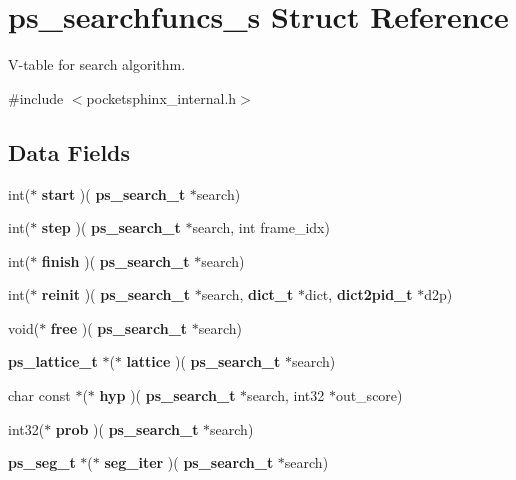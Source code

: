 \section{ps\+\_\+searchfuncs\+\_\+s Struct Reference}
\label{structps__searchfuncs__s}


V-\/table for search algorithm.  




{\ttfamily \#include $<$pocketsphinx\+\_\+internal.\+h$>$}

\subsection*{Data Fields}
\begin{DoxyCompactItemize}
\item 
\mbox{\label{structps__searchfuncs__s_aeba78bc55e0053208a406e5755e328c3}} 
int($\ast$ {\bfseries start} )(\textbf{ ps\+\_\+search\+\_\+t} $\ast$search)
\item 
\mbox{\label{structps__searchfuncs__s_a5e339a33aaa9abce12aad960ccd8ec69}} 
int($\ast$ {\bfseries step} )(\textbf{ ps\+\_\+search\+\_\+t} $\ast$search, int frame\+\_\+idx)
\item 
\mbox{\label{structps__searchfuncs__s_af1b419057d3112ed400b3e8244350298}} 
int($\ast$ {\bfseries finish} )(\textbf{ ps\+\_\+search\+\_\+t} $\ast$search)
\item 
\mbox{\label{structps__searchfuncs__s_a6ac3701ff0654da72bd55e89e4936884}} 
int($\ast$ {\bfseries reinit} )(\textbf{ ps\+\_\+search\+\_\+t} $\ast$search, \textbf{ dict\+\_\+t} $\ast$dict, \textbf{ dict2pid\+\_\+t} $\ast$d2p)
\item 
\mbox{\label{structps__searchfuncs__s_a30c9ebb9036ed7286aba45f3f25abd7e}} 
void($\ast$ {\bfseries free} )(\textbf{ ps\+\_\+search\+\_\+t} $\ast$search)
\item 
\mbox{\label{structps__searchfuncs__s_a94ff0b5cb1ae6660bba5ed3e9886e127}} 
\textbf{ ps\+\_\+lattice\+\_\+t} $\ast$($\ast$ {\bfseries lattice} )(\textbf{ ps\+\_\+search\+\_\+t} $\ast$search)
\item 
\mbox{\label{structps__searchfuncs__s_ab877722eb9871b37020a2a02c29c62c2}} 
char const  $\ast$($\ast$ {\bfseries hyp} )(\textbf{ ps\+\_\+search\+\_\+t} $\ast$search, int32 $\ast$out\+\_\+score)
\item 
\mbox{\label{structps__searchfuncs__s_aa601dc1539edfb40284e94798ba2ab40}} 
int32($\ast$ {\bfseries prob} )(\textbf{ ps\+\_\+search\+\_\+t} $\ast$search)
\item 
\mbox{\label{structps__searchfuncs__s_a0fcd958766990d506b5dfd07af899f44}} 
\textbf{ ps\+\_\+seg\+\_\+t} $\ast$($\ast$ {\bfseries seg\+\_\+iter} )(\textbf{ ps\+\_\+search\+\_\+t} $\ast$search)
\end{DoxyCompactItemize}


